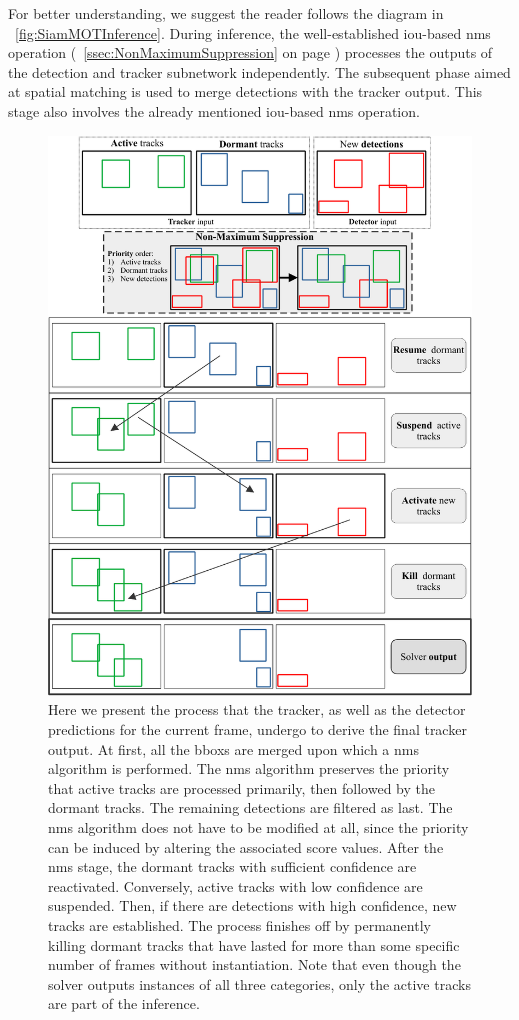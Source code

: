 For better understanding, we suggest the reader follows the diagram in \figtext{}~\ref{fig:SiamMOTInference}. During inference, the well-established \gls{iou}-based \gls{nms} operation (\sectiontext{}~\ref{ssec:NonMaximumSuppression} on page \pageref{ssec:NonMaximumSuppression}) processes the outputs of the detection and tracker subnetwork independently. The subsequent phase aimed at spatial matching is used to merge detections with the tracker output. This stage also involves the already mentioned \gls{iou}-based \gls{nms} operation.

\begin{figure}[!t]
    \centering
    \includegraphics[width=0.85\linewidth]{figures/siamese_tracking/siammot_online_solver.pdf}
    \caption[\gls{siammot} online solver]{Here we present the process that the tracker, as well as the detector predictions for the current frame, undergo to derive the final tracker output. At first, all the \glspl{bbox} are merged upon which a \gls{nms} algorithm is performed. The \gls{nms} algorithm preserves the priority that active tracks are processed primarily, then followed by the dormant tracks. The remaining detections are filtered as last. The \gls{nms} algorithm does not have to be modified at all, since the priority can be induced by altering the associated score values. After the \gls{nms} stage, the dormant tracks with sufficient confidence are reactivated. Conversely, active tracks with low confidence are suspended. Then, if there are detections with high confidence, new tracks are established. The process finishes off by permanently killing dormant tracks that have lasted for more than some specific number of frames without instantiation. Note that even though the solver outputs instances of all three categories, only the active tracks are part of the inference.}
    \label{fig:SiamMOTOnlineSolver}
\end{figure}
